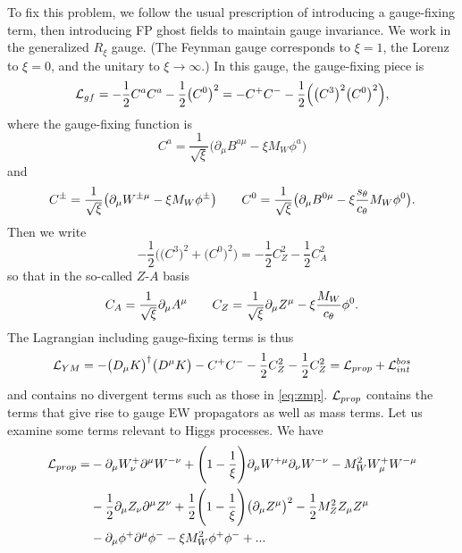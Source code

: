 To fix this problem, we follow the usual prescription of introducing a 
gauge-fixing term, then introducing FP ghost fields to maintain gauge invariance. We
work in the generalized $R_{\xi}$ gauge. (The Feynman gauge corresponds to
$\xi=1$, the Lorenz to $\xi=0$, and the unitary to $\xi\to\infty$.) In this
gauge, the gauge-fixing piece is
\begin{equation}
  \mathcal{L}_{gf}=-\frac{1}{2}C^a C^a -\frac{1}{2}\big(C^0\big)^2
            =-C^+ C^- -\frac{1}{2}\Big(\big(C^3\big)^2\big(C^0\big)^2\Big),
\end{equation}
where the gauge-fixing function is
\begin{equation}
  C^a =\frac{1}{\sqrt{\xi}}\big(\partial_{\mu}B^{a\mu}
                -\xi M_W \phi^a \big)
\end{equation}
and
\begin{equation}
  \label{eq:cdefs}
  C^{\pm}=\frac{1}{\sqrt{\xi}}\big(\partial_{\mu}W^{\pm\mu}
                   -\xi M_W \phi^{\pm}\big) \qquad
  C^{0}=\frac{1}{\sqrt{\xi}}\big(\partial_{\mu}B^{0\mu}
                   -\xi\frac{s_{\theta}}{c_{\theta}}M_W \phi^{0}\big).
\end{equation}
Then we write
\begin{equation}
  -\frac{1}{2}\Big(\big(C^3\big)^2 +\big(C^0\big)^2\Big)
       =-\frac{1}{2}C_Z^2 -\frac{1}{2}C_A^2
\end{equation}
so that in the so-called $Z$-$A$ basis
\begin{equation}
  \label{eq:zadefs}
  C_A=\frac{1}{\sqrt{\xi}}\partial_{\mu}A^{\mu} \qquad
  C_Z=\frac{1}{\sqrt{\xi}}\partial_{\mu}Z^{\mu}-\xi\frac{M_W}{c_{\theta}}\phi^0.
\end{equation}
The Lagrangian including gauge-fixing terms is thus
\begin{equation}
  \mathcal{L}_{YM}=-\big(D_{\mu}K\big)^{\dagger}\big(D^{\mu}K\big)-C^+ C^-
               -\frac{1}{2}C_Z^2-\frac{1}{2}C_Z^2
            =\mathcal{L}_{prop}+\mathcal{L}_{int}^{bos}
\end{equation}
and contains no divergent terms such as those in \eqref{eq:zmp}. $\mathcal{L}_{prop}$
contains the terms that give rise to gauge EW propagators as well as mass
terms. Let us examine some terms relevant to Higgs processes. We have
\begin{equation}
  \begin{aligned}
  \mathcal{L}_{prop}=&-\partial_{\mu}W_{\nu}^+ \partial^{\mu}W^{-\nu}
     +\Bigg(1-\frac{1}{\xi}\Bigg)\partial_{\mu}W^{+\mu}\partial_{\nu}W^{-\nu}
     -M_W^2 W_{\mu}^+ W^{-\mu} \\
    &-\frac{1}{2}\partial_{\mu}Z_{\nu}\partial^{\mu}Z^{\nu}
     +\frac{1}{2}\Bigg(1-\frac{1}{\xi}\Bigg)\big(\partial_{\mu}Z^{\mu}\big)^2
     -\frac{1}{2}M_Z^2 Z_{\mu}Z^{\mu} \\
    &-\partial_{\mu}\phi^+ \partial^{\mu}\phi^- -\xi M_W^2\phi^+ \phi^-
     +...
  \end{aligned}
\end{equation}
